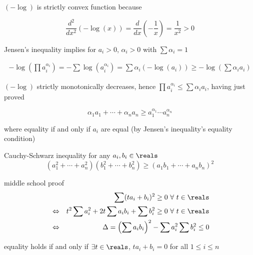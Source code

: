 \documentclass[17pt,landscape]{foils}
\begin{document}
{

\bit
\item
	$(-\log)$ is strictly convex function because

	\[
		\frac{d^2}{dx^2} \left(-\log(x)\right)
		= \frac{d}{dx} \left(-\frac{1}{x} \right)
		= \frac{1}{x^2} > 0
	\]

\vitem
	Jensen's inequality implies for $a_i >0$, $\alpha_i >0$ with $\sum \alpha_i = 1$

	\begin{eqnarray*}
		-\log\left(\prod a_i^{\alpha_i}\right)
		= -\sum \log\left( a_i^{\alpha_i}\right)
		=
		\sum \alpha_i (-\log(a_i)) \geq -\log \left(\sum \alpha_i a_i\right)
	\end{eqnarray*}

\vitem
	$(-\log)$ strictly monotonically decreases, hence $\prod a_i^{\alpha_i} \leq \sum \alpha_i a_i$,
	having just proved

	\[
		\alpha_1 a_1 + \cdots + \alpha_n a_n
			\geq
		a_1^{\alpha_1}\cdots a_n^{\alpha_n}
	\]

	where equality if and only if $a_i$ are equal
	(by Jensen's inequality's equality condition)
\eit



\begin{myinequality}{Cauchy-Schwarz inequality}
	for any $a_i, b_i\in\reals$
	\[
		( a_1^2 + \cdots + a_n^2 )
		( b_1^2 + \cdots + b_n^2 )
			\geq
		(a_1b_1 + \cdots + a_nb_n)^2
	\]
\end{myinequality}

\bit
	\vitem middle school proof
	\begin{eqnarray*}
		&&\sum (t a_i + b_i)^2 \geq 0 \ \forall\ t \in \reals
		\\
		&\Leftrightarrow&
		t^2 \sum a_i^2 + 2t \sum a_ib_i + \sum b_i^2 \geq 0 \ \forall\ t \in \reals
		\\
		&\Leftrightarrow&
		\Delta = \left(\sum a_ib_i \right)^2 - \sum a_i^2 \sum b_i^2 \leq 0
	\end{eqnarray*}
	\bit
		\item equality holds if and only if $\exists t\in\reals$, $t a_i + b_i=0$ for all $1\leq i\leq n$
	\eit
\eit


}
\end{document}
